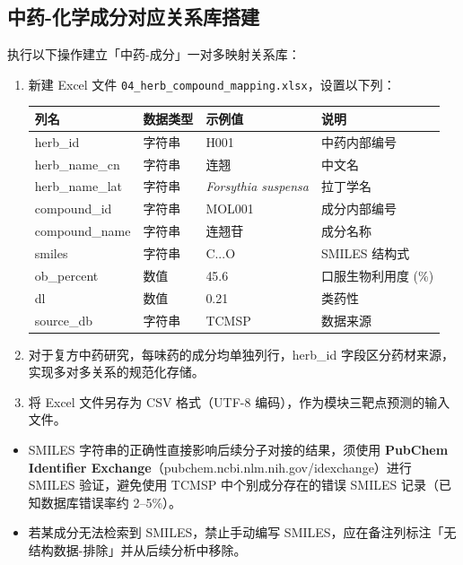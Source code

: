 \documentclass[12pt,a4paper,twoside]{article}
\newcommand{\database}[1]{\textbf{\textsf{#1}}}
\begin{document}
\subsection{中药-化学成分对应关系库搭建}
\label{sec:module2_mapping}

执行以下操作建立「中药-成分」一对多映射关系库：

\begin{enumerate}
  \item 新建 Excel 文件 \texttt{04\_herb\_compound\_mapping.xlsx}，设置以下列：
    \begin{center}
    \begin{tabular}{llll}
    \toprule
    \textbf{列名} & \textbf{数据类型} & \textbf{示例值} & \textbf{说明} \\
    \midrule
    herb\_id & 字符串 & H001 & 中药内部编号 \\
    herb\_name\_cn & 字符串 & 连翘 & 中文名 \\
    herb\_name\_lat & 字符串 & \textit{Forsythia suspensa} & 拉丁学名 \\
    compound\_id & 字符串 & MOL001 & 成分内部编号 \\
    compound\_name & 字符串 & 连翘苷 & 成分名称 \\
    smiles & 字符串 & C...O & SMILES 结构式 \\
    ob\_percent & 数值 & 45.6 & 口服生物利用度 (\%) \\
    dl & 数值 & 0.21 & 类药性 \\
    source\_db & 字符串 & TCMSP & 数据来源 \\
    \bottomrule
    \end{tabular}
    \end{center}

  \item 对于复方中药研究，每味药的成分均单独列行，herb\_id 字段区分药材来源，实现多对多关系的规范化存储。

  \item 将 Excel 文件另存为 CSV 格式（UTF-8 编码），作为模块三靶点预测的输入文件。
\end{enumerate}

\begin{warningbox}
\begin{itemize}
  \item SMILES 字符串的正确性直接影响后续分子对接的结果，须使用 \database{PubChem Identifier Exchange}（pubchem.ncbi.nlm.nih.gov/idexchange）进行 SMILES 验证，避免使用 TCMSP 中个别成分存在的错误 SMILES 记录（已知数据库错误率约 2--5\%）。
  \item 若某成分无法检索到 SMILES，禁止手动编写 SMILES，应在备注列标注「无结构数据-排除」并从后续分析中移除。
\end{itemize}
\end{warningbox}
\end{document}
